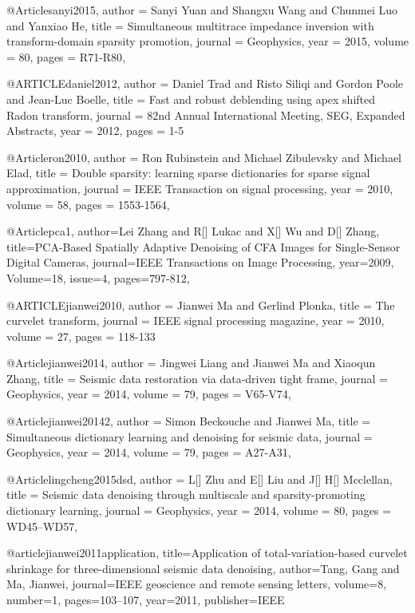 @Article{sanyi2015,
  author = 	 {Sanyi Yuan and Shangxu Wang and Chunmei Luo and Yanxiao He},
  title = 	 {Simultaneous multitrace impedance inversion with transform-domain sparsity promotion},
  journal = 	 {Geophysics},
  year = 	 2015,
  volume =	 80,
  pages =	 {R71-R80},
}

@ARTICLE{daniel2012,
  author = {Daniel Trad and Risto Siliqi and Gordon Poole and Jean-Luc Boelle},
  title = {Fast and robust deblending using apex shifted Radon transform},
  journal = {82nd Annual International Meeting, SEG, Expanded Abstracts},
  year = {2012},
  pages = {1-5}
}

@Article{ron2010,
  author = 	 {Ron Rubinstein and Michael Zibulevsky and Michael Elad},
  title = 	 {Double sparsity: learning sparse dictionaries for sparse signal approximation},
  journal = 	 {IEEE Transaction on signal processing},
  year = 	 2010,
  volume =	 58,
  pages =	 {1553-1564},
}

@Article{pca1,
  author={Lei Zhang and R[] Lukac and X[] Wu and D[] Zhang},
  title={PCA-Based Spatially Adaptive Denoising of {CFA} Images for Single-Sensor Digital Cameras},
  journal={IEEE Transactions on Image Processing},
  year=2009,
  Volume=18,
  issue=4,
  pages={797-812},
}

@ARTICLE{jianwei2010,
  author = {Jianwei Ma and Gerlind Plonka},
  title = {The curvelet transform},
  journal = {IEEE signal processing magazine},
  year = {2010},
  volume = {27},
  pages = {118-133}
}

@Article{jianwei2014,
  author = 	 {Jingwei Liang and Jianwei Ma and Xiaoqun Zhang},
  title = 	 {Seismic data restoration via data-driven tight frame},
  journal = 	 {Geophysics},
  year = 	 2014,
  volume =	 79,
  pages =	 {V65-V74},
}

@Article{jianwei20142,
  author = 	 {Simon Beckouche and Jianwei Ma},
  title = 	 {Simultaneous dictionary learning and denoising for seismic data},
  journal = 	 {Geophysics},
  year = 	 2014,
  volume =	 79,
  pages =	 {A27-A31},
}

@Article{lingcheng2015dsd,
  author = 	 {L[] Zhu and E[] Liu and J[] H[] Mcclellan},
  title = 	 {Seismic data denoising through multiscale and sparsity-promoting dictionary learning},
  journal = 	 {Geophysics},
  year = 	 2014,
  volume =	 80,
  pages =	 {WD45–WD57},
}





@article{jianwei2011application,
  title={Application of total-variation-based curvelet shrinkage for three-dimensional seismic data denoising},
  author={Tang, Gang and Ma, Jianwei},
  journal={IEEE geoscience and remote sensing letters},
  volume={8},
  number={1},
  pages={103--107},
  year={2011},
  publisher={IEEE}
}

